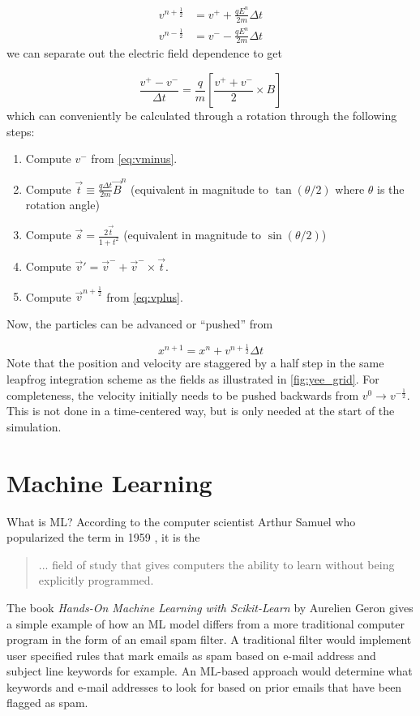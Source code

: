 \begin{align}
	v^{n + \frac{1}{2}} &= v^+ + \frac{q E^n}{2 m} \Delta t \label{eq:vplus} \\
	v^{n - \frac{1}{2}} &= v^- - \frac{q E^n}{2 m} \Delta t \label{eq:vminus}
\end{align}
we can separate out the electric field dependence to get 

\begin{equation}
	\frac{v^+ - v^-}{\Delta t} = \frac{q}{m}[\frac{v^+ + v^-}{2} \times B]
\end{equation}
which can conveniently be calculated through a rotation \cite{Birdsall_2004_PIC} through the following steps:

\begin{enumerate}
	\item Compute $v^-$ from \autoref{eq:vminus}.
	\item Compute $\vec{t} \equiv \frac{q \Delta t}{2 m} \vec{B}^n $ (equivalent in magnitude to $\tan(\theta/2)$ where $\theta$ is the rotation angle)
	\item Compute $\vec{s} = \frac{2 \vec{t}}{1 + t^2}$ (equivalent in magnitude to $\sin(\theta/2)$)
	\item Compute $\vec{v}' = \vec{v}^- + \vec{v}^- \times \vec{t}$.
	\item Compute $\vec{v}^{n+\frac{1}{2}}$ from \autoref{eq:vplus}.
\end{enumerate}
Now, the particles can be advanced or ``pushed'' from

\begin{equation}
	x^{n+1} = x^{n} + v^{n+\frac{1}{2}} \Delta t \label{eq:particlepush}
\end{equation}
Note that the position and velocity are staggered by a half step in the same leapfrog integration scheme as the fields as illustrated in \autoref{fig:yee_grid}. For completeness, the velocity initially needs to be pushed backwards from $v^{0} \rightarrow v^{-\frac{1}{2}}$. This is not done in a time-centered way, but is only needed at the start of the simulation. 

\section{Machine Learning}
What is \gls{ML}? According to the computer scientist Arthur Samuel who popularized the term in 1959 \cite{Geron_2023_ML}, it is the 

\begin{quote}
	... field of study that gives computers the ability to learn without being explicitly programmed. 
\end{quote}
The book \emph{Hands-On Machine Learning with Scikit-Learn} by Aurelien Geron \cite{Geron_2023_ML} gives a simple example of how an \gls{ML} model differs from a more traditional computer program in the form of an email spam filter. A traditional filter would implement user specified rules that mark emails as spam based on e-mail address and subject line keywords for example. An \gls{ML}-based approach would determine what keywords and e-mail addresses to look for based on prior emails that have been flagged as spam.

